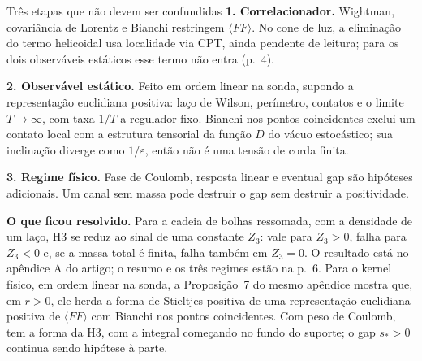 \documentclass[11pt,a4paper]{article}
\begin{document}
\begin{panel}{Três etapas que não devem ser confundidas}
\textbf{1. Correlacionador.} Wightman, covariância de Lorentz e Bianchi
restringem $\langle FF\rangle$. No cone de luz, a eliminação do termo
helicoidal usa localidade via CPT, ainda pendente de leitura; para os dois
observáveis estáticos esse termo não entra (p.~4).

\textbf{2. Observável estático.} Feito em ordem linear na sonda, supondo a
representação euclidiana positiva: laço de Wilson, perímetro, contatos e o
limite $T\to\infty$, com taxa $1/T$ a regulador fixo. Bianchi nos pontos
coincidentes exclui um contato local com a estrutura tensorial da função $D$
do vácuo estocástico; sua inclinação diverge como $1/\varepsilon$, então não
é uma tensão de corda finita.

\textbf{3. Regime físico.} Fase de Coulomb, resposta linear e eventual gap
são hipóteses adicionais. Um canal sem massa pode destruir o gap sem
destruir a positividade.
\end{panel}
\textbf{O que ficou resolvido.} Para a cadeia de bolhas ressomada, com a
densidade de um laço, H3 se reduz ao sinal de uma constante $Z_3$: vale
para $Z_3>0$, falha para $Z_3<0$ e, se a massa total é finita, falha
também em $Z_3=0$. O
resultado está no apêndice A do artigo; o resumo e os três regimes estão
na p.~6. Para o kernel físico, em ordem linear na sonda, a Proposição~7 do
mesmo apêndice mostra que, em $r>0$, ele herda a forma de Stieltjes positiva
de uma representação euclidiana positiva de $\langle FF\rangle$ com Bianchi
nos pontos coincidentes. Com peso de Coulomb, tem a forma da H3, com a
integral começando no fundo do suporte; o gap $s_*>0$ continua sendo
hipótese à parte.
\end{document}
